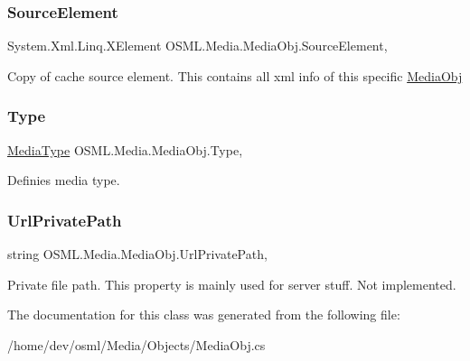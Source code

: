 \subsubsection{\texorpdfstring{SourceElement}{SourceElement}}
{\footnotesize\ttfamily System.\+Xml.\+Linq.\+X\+Element O\+S\+M\+L.\+Media.\+Media\+Obj.\+Source\+Element\hspace{0.3cm}{\ttfamily [get]}, {\ttfamily [set]}}



Copy of cache source element. This contains all xml info of this specific \mbox{\hyperlink{classOSML_1_1Media_1_1MediaObj}{Media\+Obj}} 

\mbox{\label{classOSML_1_1Media_1_1MediaObj_a84e20f6bdfd69916e9aed53a8a825e89}} 
\subsubsection{\texorpdfstring{Type}{Type}}
{\footnotesize\ttfamily \mbox{\hyperlink{namespaceOSML_1_1Media_aa3e4261aa5181fcc93920ffe409e8b02}{Media\+Type}} O\+S\+M\+L.\+Media.\+Media\+Obj.\+Type\hspace{0.3cm}{\ttfamily [get]}, {\ttfamily [set]}}



Definies media type. 

\mbox{\label{classOSML_1_1Media_1_1MediaObj_a8ecc20f36044949ce3fde1af609e55f9}} 
\subsubsection{\texorpdfstring{UrlPrivatePath}{UrlPrivatePath}}
{\footnotesize\ttfamily string O\+S\+M\+L.\+Media.\+Media\+Obj.\+Url\+Private\+Path\hspace{0.3cm}{\ttfamily [get]}, {\ttfamily [set]}}



Private file path. This property is mainly used for server stuff. Not implemented. 



The documentation for this class was generated from the following file\+:\begin{DoxyCompactItemize}
\item 
/home/dev/osml/\+Media/\+Objects/Media\+Obj.\+cs\end{DoxyCompactItemize}
